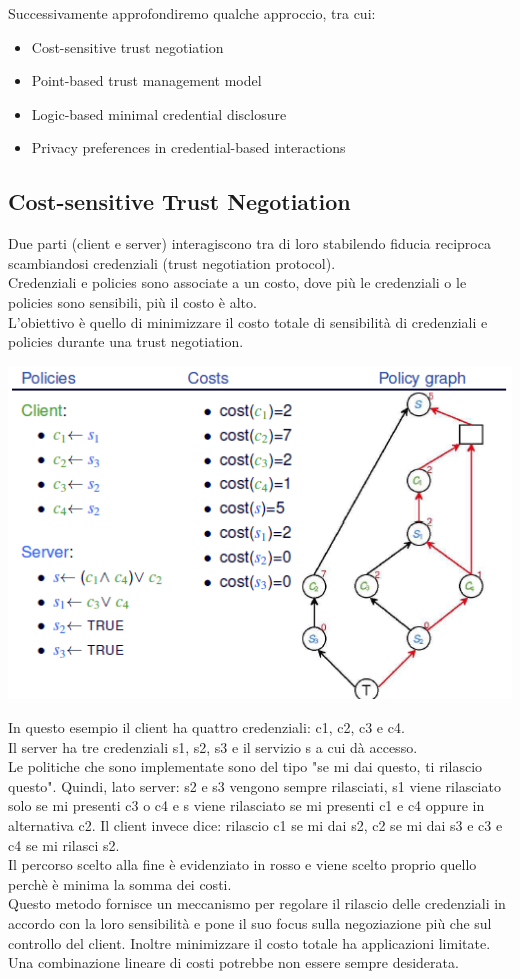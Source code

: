 Successivamente approfondiremo qualche approccio, tra cui:
\begin{itemize}
    \item Cost-sensitive trust negotiation
    \item Point-based trust management model
    \item Logic-based minimal credential disclosure
    \item Privacy preferences in credential-based interactions
\end{itemize}

\subsection{Cost-sensitive Trust Negotiation}
Due parti (client e server) interagiscono tra di loro stabilendo fiducia reciproca scambiandosi credenziali (trust negotiation protocol). \\ Credenziali e policies sono associate a un costo, dove più le credenziali o le policies sono sensibili, più il costo è alto.\\
L'obiettivo è quello di minimizzare il costo totale di sensibilità di credenziali e policies durante una trust negotiation.
\begin{center}
    \includegraphics[scale=0.6]{img/csens.png}
\end{center}
In questo esempio il client ha quattro credenziali: c1, c2, c3 e c4.\\
Il server ha tre credenziali s1, s2, s3 e il servizio s a cui dà accesso.\\
Le politiche che sono implementate sono del tipo "se mi dai questo, ti rilascio questo". Quindi, lato server: s2 e s3 vengono sempre rilasciati, s1 viene rilasciato solo se mi presenti c3 o c4 e s viene rilasciato se mi presenti c1 e c4 oppure in alternativa c2. Il client invece dice: rilascio c1 se mi dai s2, c2 se mi dai s3 e c3 e c4 se mi rilasci s2. \\
Il percorso scelto alla fine è evidenziato in rosso e viene scelto proprio quello perchè è minima la somma dei costi.\\
Questo metodo fornisce un meccanismo per regolare il rilascio delle credenziali in accordo con la loro sensibilità e pone il suo focus sulla negoziazione più che sul controllo del client. Inoltre minimizzare il costo totale ha applicazioni limitate. Una combinazione lineare di costi potrebbe non essere sempre desiderata.

